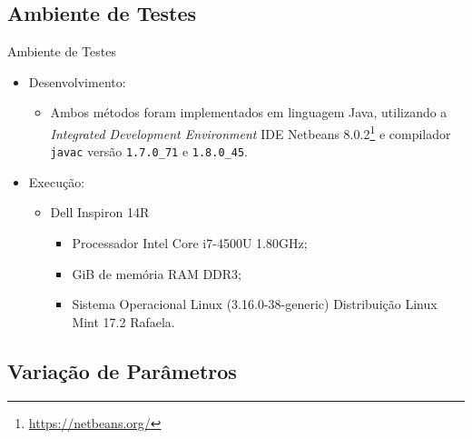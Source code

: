 \documentclass[compress, hide notes]{beamer}
\let\olditem=\item%
\renewcommand{\item}{\olditem \justifying}%
\begin{document}
		\subsection{Ambiente de Testes}
		
			\begin{frame}[fragile]{Ambiente de Testes}
				
				\begin{itemize}
					\item Desenvolvimento:
                    
                    \begin{itemize}
						\item Ambos métodos foram implementados em linguagem Java, utilizando a \textit{Integrated Development Environment} IDE Netbeans 8.0.2\footnote{\url{https://netbeans.org/}} e compilador \verb|javac| versão \verb|1.7.0_71| e \verb|1.8.0_45|.
					\end{itemize}
                    
                    \bigskip
                    
                    \item Execução:
                 	
                    
                    \begin{itemize}
						\bigskip
                      \item Dell Inspiron 14R
                      \begin{itemize}
                          \item Processador Intel Core i7-4500U 1.80GHz;
                          \item 7.7 GiB de memória RAM DDR3;
                          \item Sistema Operacional Linux (3.16.0-38-generic) Distribuição Linux Mint 17.2 Rafaela.
                      \end{itemize}


					\end{itemize}
                    
                    
				\end{itemize}
				
			\end{frame}
		
        
        
        
        
		\subsection{Variação de Parâmetros}
		
\end{document}
